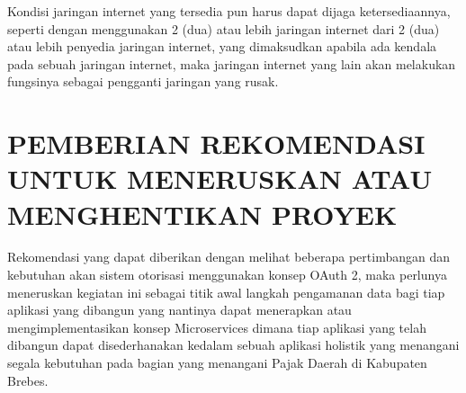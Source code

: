 \documentclass[pdftex,12pt, oneside]{article}
\begin{document}
Kondisi jaringan internet yang tersedia pun harus dapat dijaga ketersediaannya, seperti dengan menggunakan 2 (dua) atau lebih jaringan internet dari 2 (dua) atau lebih penyedia jaringan internet, yang dimaksudkan apabila ada kendala pada sebuah jaringan internet, maka jaringan internet yang lain akan melakukan fungsinya sebagai pengganti jaringan yang rusak.

\section{PEMBERIAN REKOMENDASI UNTUK MENERUSKAN ATAU MENGHENTIKAN PROYEK}

Rekomendasi yang dapat diberikan dengan melihat beberapa pertimbangan dan kebutuhan akan sistem otorisasi menggunakan konsep OAuth 2, maka perlunya meneruskan kegiatan ini sebagai titik awal langkah pengamanan data bagi tiap aplikasi yang dibangun yang nantinya dapat menerapkan atau mengimplementasikan konsep Microservices dimana tiap aplikasi yang telah dibangun dapat disederhanakan kedalam sebuah aplikasi holistik yang menangani segala kebutuhan pada bagian yang menangani Pajak Daerah di Kabupaten Brebes.
\end{document}
